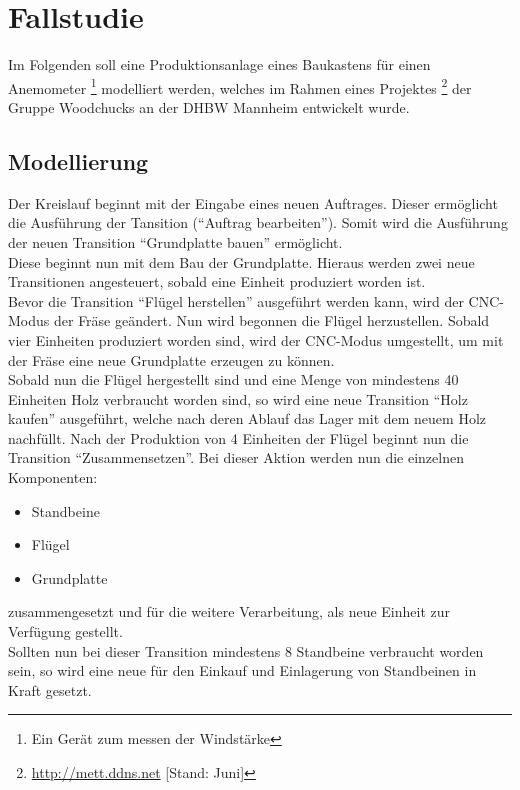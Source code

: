 \chapter{Fallstudie}
\label{chap:fallstudie}
Im Folgenden soll eine Produktionsanlage eines Baukastens für einen
Anemometer \footnote{Ein Gerät zum messen der Windstärke} modelliert werden, welches im Rahmen eines Projektes \footnote{\url{http://mett.ddns.net} [Stand: Juni]}  der Gruppe Woodchucks an der DHBW Mannheim entwickelt wurde.
\section{Modellierung}
Der Kreislauf beginnt mit der Eingabe eines neuen Auftrages. Dieser ermöglicht die Ausführung der Tansition ("`Auftrag bearbeiten"').
Somit wird die Ausführung der neuen Transition "`Grundplatte bauen"' ermöglicht. \\ Diese beginnt nun mit dem Bau der Grundplatte. Hieraus werden zwei neue Transitionen angesteuert, sobald eine Einheit produziert worden ist. \\ Bevor die Transition "`Flügel herstellen"' ausgeführt werden kann, wird der CNC-Modus der Fräse geändert.  Nun wird begonnen die Flügel herzustellen. Sobald vier Einheiten produziert worden sind, wird der CNC-Modus umgestellt, um mit der Fräse eine neue Grundplatte erzeugen zu können. \\ Sobald nun die Flügel hergestellt sind und eine Menge von mindestens 40 Einheiten Holz verbraucht worden sind, so wird eine neue Transition "`Holz kaufen"' ausgeführt, welche nach deren Ablauf das Lager mit dem neuem Holz nachfüllt. Nach der Produktion von 4 Einheiten der Flügel beginnt nun die Transition "`Zusammensetzen"'. Bei dieser Aktion werden nun die einzelnen Komponenten: \begin{itemize}
	\itemsep0pt
	\item Standbeine
	\item Flügel
	\item Grundplatte
\end{itemize} zusammengesetzt und für die weitere Verarbeitung, als neue Einheit zur Verfügung gestellt. \\ Sollten nun bei dieser Transition mindestens 8 Standbeine verbraucht worden sein, so wird eine neue für den Einkauf und Einlagerung von Standbeinen in Kraft gesetzt.
